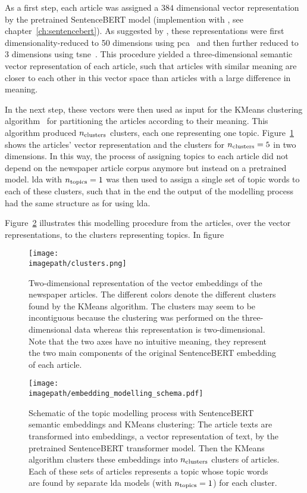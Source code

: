 As a first step, each article was assigned a $384$ dimensional vector representation by the pretrained SentenceBERT model (implemention with \textcite{sbertsentencetransformers_sentencetransformers_2022}, see chapter~\ref{ch:sentencebert}). As suggested by \textcite{black_using_2020}, these representations were first dimensionality-reduced to \SI{50}{} dimensions using \gls{pca}~\autocite{pearson_liii_1901} and then further reduced to \SI{3}{} dimensions using \gls{tsne}~\autocite{maaten_visualizing_2008}. This procedure yielded a three-dimensional semantic vector representation of each article, such that articles with similar meaning are closer to each other in this vector space than articles with a large difference in meaning.

In the next step, these vectors were then used as input for the KMeans clustering algorithm~\autocite{1967} for partitioning the articles according to their meaning. This algorithm produced $n_\text{clusters}$ clusters, each one representing one topic. Figure~\ref{fig:clusters} shows the articles' vector representation and the clusters for $n_\text{clusters}=5$ in two dimensions. In this way, the process of assigning topics to each article did not depend on the newspaper article corpus anymore but instead on a pretrained model. \gls{lda} with $n_\text{topics}=1$ was then used to assign a single set of topic words to each of these clusters, such that in the end the output of the modelling process had the same structure as for using \gls{lda}. 

Figure~\ref{fig:embedding_modelling_schema} illustrates this modelling procedure from the articles, over the vector representations, to the clusters representing topics. In figure~

\begin{figure}
    \centering
    \texttt{[image: \\imagepath/clusters.png]}
    \caption{Two-dimensional representation of the vector embeddings of the newspaper articles. The different colors denote the different clusters found by the KMeans algorithm. The clusters may seem to be incontiguous because the clustering was performed on the three-dimensional data whereas this representation is two-dimensional. Note that the two axes have no intuitive meaning, they represent the two main components of the original SentenceBERT embedding of each article.}\label{fig:clusters}
\end{figure}

\begin{figure}
    \centering
    \texttt{[image: \\imagepath/embedding\_modelling\_schema.pdf]}
    \caption{Schematic of the topic modelling process with SentenceBERT semantic embeddings and KMeans clustering: The article texts are transformed into embeddings, a vector representation of text, by the pretrained SentenceBERT transformer model. Then the KMeans algorithm clusters these embeddings into $n_\text{clusters}$ clusters of articles. Each of these sets of articles represents a topic whose topic words are found by separate \gls{lda} models (with $n_\text{topics}=1$) for each cluster.}\label{fig:embedding_modelling_schema}
\end{figure}

